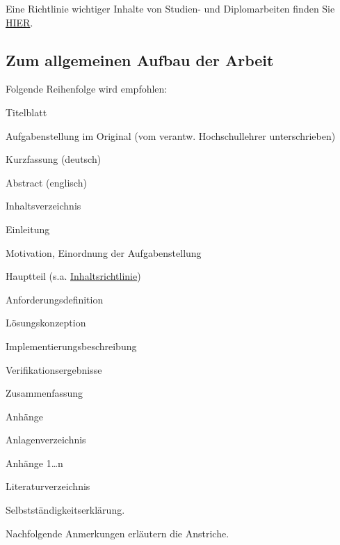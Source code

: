 Eine Richtlinie wichtiger Inhalte von Studien- und Diplomarbeiten finden Sie \href{http://www.et.tu-dresden.de/ifa/index.php?id=336&L=1?keepThis=true}{HIER}.

\subsection{Zum allgemeinen Aufbau der Arbeit}
\label{sec:ZumAllgemeinenAufbauDerArbeit}

Folgende Reihenfolge wird empfohlen:
\begin{compactitem}
  \item Titelblatt
  \item Aufgabenstellung im Original (vom verantw. Hochschullehrer unterschrieben)
  \item Kurzfassung (deutsch)
  \item Abstract (englisch)
  \item Inhaltsverzeichnis
  \item Einleitung
  \begin{compactitem}
    \item Motivation, Einordnung der Aufgabenstellung
  \end{compactitem}
  \item Hauptteil (s.a. \href{http://www.et.tu-dresden.de/ifa/index.php?id=336&L=1?keepThis=true}{Inhaltsrichtlinie})
  \begin{compactitem}
    \item Anforderungsdefinition
    \item Lösungskonzeption
    \item Implementierungsbeschreibung
    \item Verifikationsergebnisse
  \end{compactitem}
  \item Zusammenfassung
  \item Anhänge
  \begin{compactitem}
    \item Anlagenverzeichnis
    \item Anhänge 1\dots n
  \end{compactitem}
  \item Literaturverzeichnis
  \item Selbstständigkeitserklärung.
\end{compactitem}

Nachfolgende Anmerkungen erläutern die Anstriche.


